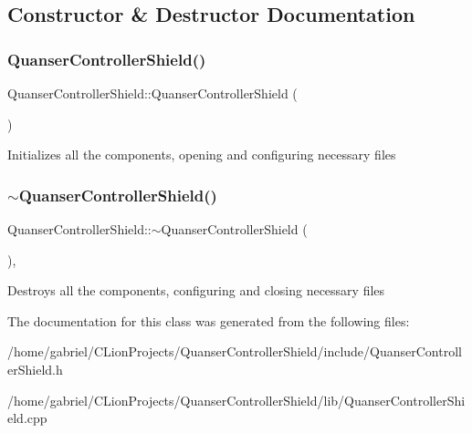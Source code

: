 \subsection{Constructor \& Destructor Documentation}
\mbox{\label{classQuanserControllerShield_a965410baa27ff59baa08bf1e49a7f1eb}} 
\subsubsection{\texorpdfstring{Quanser\+Controller\+Shield()}{QuanserControllerShield()}}
{\footnotesize\ttfamily Quanser\+Controller\+Shield\+::\+Quanser\+Controller\+Shield (\begin{DoxyParamCaption}{ }\end{DoxyParamCaption})\hspace{0.3cm}{\ttfamily [default]}}

Initializes all the components, opening and configuring necessary files \mbox{\label{classQuanserControllerShield_a60b539f19bf54838086557c8c3e7a1bb}} 
\subsubsection{\texorpdfstring{$\sim$\+Quanser\+Controller\+Shield()}{~QuanserControllerShield()}}
{\footnotesize\ttfamily Quanser\+Controller\+Shield\+::$\sim$\+Quanser\+Controller\+Shield (\begin{DoxyParamCaption}{ }\end{DoxyParamCaption})\hspace{0.3cm}{\ttfamily [virtual]}, {\ttfamily [default]}}

Destroys all the components, configuring and closing necessary files 

The documentation for this class was generated from the following files\+:\begin{DoxyCompactItemize}
\item 
/home/gabriel/\+C\+Lion\+Projects/\+Quanser\+Controller\+Shield/include/Quanser\+Controller\+Shield.\+h\item 
/home/gabriel/\+C\+Lion\+Projects/\+Quanser\+Controller\+Shield/lib/Quanser\+Controller\+Shield.\+cpp\end{DoxyCompactItemize}
